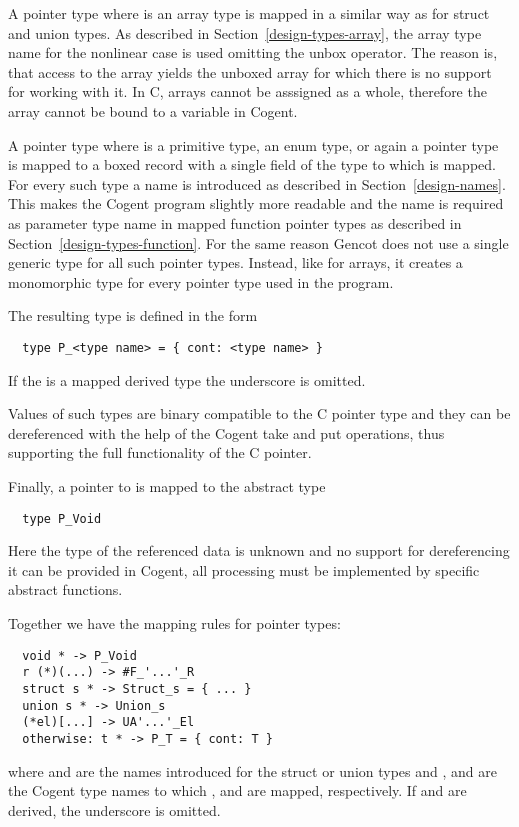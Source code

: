A pointer type  where  is an array type is mapped in a similar way as for struct and
union types. As described in Section~\ref{design-types-array}, the array type name for the nonlinear case is
used omitting the unbox operator. The reason is, that access to the array yields the unboxed array for
which there is no support for working with it. In C, arrays cannot be asssigned as a whole, therefore
the array cannot be bound to a variable in Cogent.

A pointer type  where  is a primitive type, an enum type, 
or again a pointer type is mapped to a boxed record with a single field  of the type to which  is 
mapped. For every such type a name is introduced as described in Section~\ref{design-names}. This makes the 
Cogent program slightly more readable and the name is required as parameter type name in mapped function pointer 
types as described in Section~\ref{design-types-function}. For the same reason Gencot does not use a single generic type for all 
such pointer types. Instead, like for arrays, it creates a monomorphic type for every pointer type used in the program.

The resulting type is defined in the form
\begin{verbatim}
  type P_<type name> = { cont: <type name> }
\end{verbatim}
If the  is a mapped derived type the underscore is omitted.

Values of such types are binary compatible to the C pointer type and they can be dereferenced with the help of
the Cogent take and put operations, thus supporting the full functionality of the C pointer.

Finally, a pointer to  is mapped to the abstract type
\begin{verbatim}
  type P_Void
\end{verbatim}
Here the type of the referenced data is unknown and no support for dereferencing it can be provided in Cogent,
all processing must be implemented by specific abstract functions.

Together we have the mapping rules for pointer types:
\begin{verbatim}
  void * -> P_Void
  r (*)(...) -> #F_'...'_R
  struct s * -> Struct_s = { ... }
  union s * -> Union_s
  (*el)[...] -> UA'...'_El
  otherwise: t * -> P_T = { cont: T }
\end{verbatim}
where  and  are the names introduced for the struct or union types and ,  
and  are the Cogent type names to which ,  and  are mapped, respectively. If  
and  are derived, the underscore is omitted.

